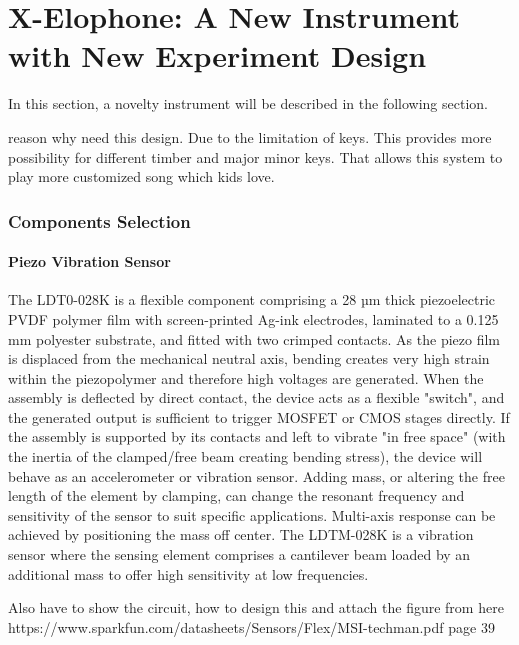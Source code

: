 \chapter{X-Elophone: A New Instrument with New Experiment Design}
In this section, a novelty instrument will be described in the following section.

reason why need this design. Due to the limitation of keys. This provides more 
possibility for different timber and major minor keys. That allows this system to 
play more customized song which kids love.

\subsection{Components Selection}

\subsubsection{Piezo Vibration Sensor}

The LDT0-028K is a flexible component comprising a 28 µm thick piezoelectric PVDF
polymer film with screen-printed Ag-ink electrodes, laminated to a 0.125 mm polyester 
substrate, and fitted with two crimped contacts. As the piezo film is displaced from 
the mechanical neutral axis, bending creates very high strain within the piezopolymer 
and therefore high voltages are generated. When the assembly is deflected by direct 
contact, the device acts as a flexible "switch", and the generated output is sufficient 
to trigger MOSFET or CMOS stages directly. If the assembly is supported by its contacts 
and left to vibrate "in free space" (with the inertia of the clamped/free beam creating 
bending stress), the device will behave as an accelerometer or vibration sensor. Adding 
mass, or altering the free length of the element by clamping, can change the resonant 
frequency and sensitivity of the sensor to suit specific applications. Multi-axis response 
can be achieved by positioning the mass off center. The LDTM-028K is a vibration sensor 
where the sensing element comprises a cantilever beam loaded by an additional mass to 
offer high sensitivity at low frequencies. 

Also have to show the circuit, how to design this and attach the figure from here
https://www.sparkfun.com/datasheets/Sensors/Flex/MSI-techman.pdf
page 39


